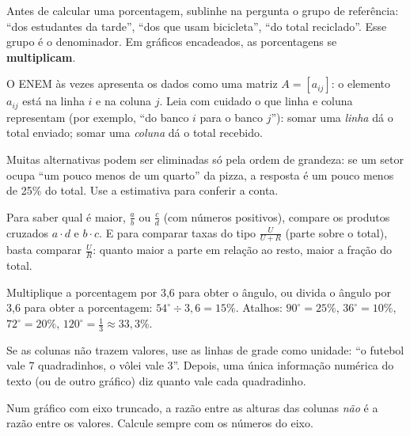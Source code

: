 \begin{dica}
Antes de calcular uma porcentagem, sublinhe na pergunta o grupo de referência:
“dos estudantes da tarde”, “dos que usam bicicleta”, “do total reciclado”. Esse
grupo é o denominador. Em gráficos encadeados, as porcentagens se
\textbf{multiplicam}.
\end{dica}

\begin{dica}
O ENEM às vezes apresenta os dados como uma matriz $A=[a_{ij}]$: o elemento
$a_{ij}$ está na linha $i$ e na coluna $j$. Leia com cuidado o que linha e coluna
representam (por exemplo, “do banco $i$ para o banco $j$”): somar uma
\emph{linha} dá o total enviado; somar uma \emph{coluna} dá o total recebido.
\end{dica}

\begin{dica}
Muitas alternativas podem ser eliminadas só pela ordem de grandeza: se um setor
ocupa “um pouco menos de um quarto” da pizza, a resposta é um pouco menos de
25\% do total. Use a estimativa para conferir a conta.
\end{dica}

\begin{macete}
Para saber qual é maior, $\frac{a}{b}$ ou $\frac{c}{d}$ (com números positivos),
compare os produtos cruzados $a\cdot d$ e $b\cdot c$. E para comparar taxas do tipo
$\frac{U}{U+R}$ (parte sobre o total), basta comparar $\frac{U}{R}$: quanto maior
a parte em relação ao resto, maior a fração do total.
\end{macete}

\begin{macete}
Multiplique a porcentagem por 3,6 para obter o ângulo, ou divida o ângulo por
3,6 para obter a porcentagem: $54^\circ \div 3{,}6=15\%$. Atalhos:
$90^\circ=25\%$, $36^\circ=10\%$, $72^\circ=20\%$, $120^\circ=\frac13\approx33{,}3\%$.
\end{macete}

\begin{macete}
Se as colunas não trazem valores, use as linhas de grade como unidade: “o
futebol vale 7 quadradinhos, o vôlei vale 3”. Depois, uma única informação
numérica do texto (ou de outro gráfico) diz quanto vale cada quadradinho.
\end{macete}

\begin{atencao}
Num gráfico com eixo truncado, a razão entre as alturas das colunas \emph{não} é
a razão entre os valores. Calcule sempre com os números do eixo.
\end{atencao}

